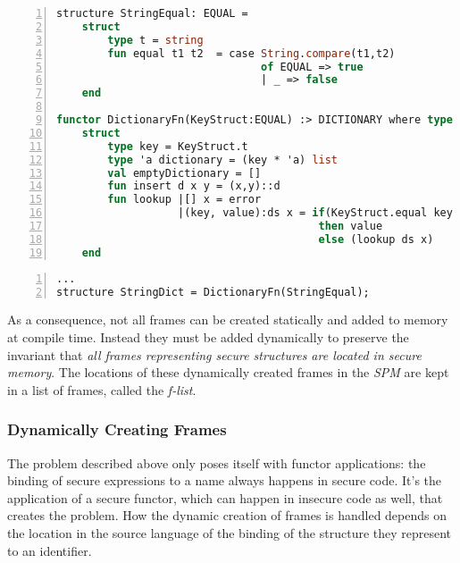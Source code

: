 \begin{lstlisting}[frame=single,numbers=left, language=ML, caption={[Secure Code Fragment]Secure code fragment: secure.ml.},
label=code:SecureCodeFragment, morekeywords={where}]
structure StringEqual: EQUAL = 
    struct
        type t = string
        fun equal t1 t2  = case String.compare(t1,t2)
                                of EQUAL => true
                                | _ => false
    end
    
functor DictionaryFn(KeyStruct:EQUAL) :> DICTIONARY where type key = KeyStruct.t =
    struct
        type key = KeyStruct.t
        type 'a dictionary = (key * 'a) list
        val emptyDictionary = []
        fun insert d x y = (x,y)::d
        fun lookup |[] x = error
                   |(key, value):ds x = if(KeyStruct.equal key x)
                                         then value
                                         else (lookup ds x)
    end
\end{lstlisting}

\begin{lstlisting}[frame=single,numbers=left, language=ML, caption={[Insecure Context Fragment]Fragment of the insecure context: context.ml.}, label={code:ContextFragment}, morekeywords={where}]
...
structure StringDict = DictionaryFn(StringEqual);
\end{lstlisting}

As a consequence, not all frames can be created statically and added to memory at compile time.
Instead they must be added dynamically to preserve the invariant that \emph{all frames representing secure structures are located in secure memory}.
The locations of these dynamically created frames in the \emph{SPM} are kept in a list of frames, called the \emph{f-list}.

\subsubsection{Dynamically Creating Frames\label{sec:DynamicalCreationOfFrames}}
The problem described above only poses itself with functor applications: the binding of secure  expressions to a name always happens in secure code.
It's the application of a secure functor, which can happen in insecure code as well, that creates the problem.
How the dynamic creation of frames is handled depends on the location in the source language of the binding of the structure they represent to an identifier.

